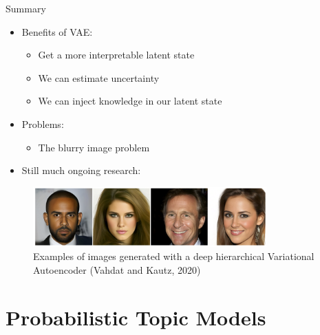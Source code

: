 \documentclass[10pt]{beamer}
\begin{document}
\begin{frame}{Summary}

\begin{itemize}
\item Benefits of VAE:
\begin{itemize}
\item Get a more interpretable latent state
\item We can estimate uncertainty
\item We can inject knowledge in our latent state
\end{itemize}
\pause
\item Problems:
\begin{itemize}
\item The blurry image problem %
\end{itemize}
\pause
\item Still much ongoing research:
\end{itemize}

\begin{figure}[h]
\centering
\includegraphics[width=0.8\textwidth]{fig/Vahdat_Kautz_NVEA_2020.png}
\caption{Examples of images generated with a deep hierarchical Variational Autoencoder (Vahdat and Kautz, 2020)}
\end{figure}

\end{frame}



\section{Probabilistic Topic Models}

\frame{\sectionpage}
\end{document}
